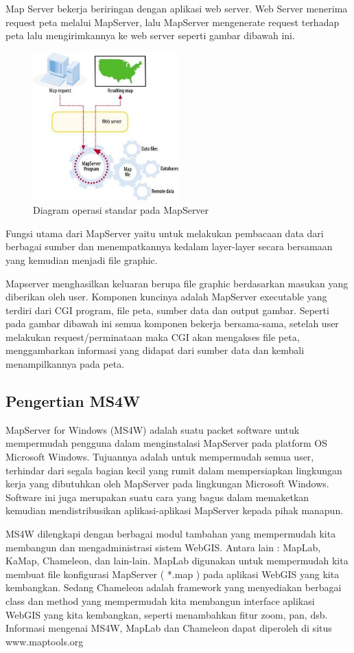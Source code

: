 Map Server bekerja beriringan dengan aplikasi web server. Web Server menerima request peta melalui MapServer, lalu MapServer mengenerate request terhadap peta lalu mengirimkannya ke web server seperti gambar dibawah ini.
\begin{figure}[ht]
	    \centerline{\includegraphics[width=0.50\textwidth]{figures/gambar5.JPG}}
	    \caption{Diagram operasi standar pada MapServer}
		\label{gambar5}
		\end{figure}
Fungsi utama dari MapServer yaitu untuk melakukan pembacaan data dari berbagai sumber dan menempatkannya kedalam layer-layer secara bersamaan yang kemudian menjadi file graphic.

Mapserver menghasilkan keluaran berupa file graphic berdasarkan masukan yang diberikan oleh user. Komponen kuncinya adalah MapServer executable yang terdiri dari CGI program, file peta, sumber data dan output gambar. Seperti pada gambar dibawah ini semua komponen bekerja bersama-sama, setelah user melakukan request/perminataan maka CGI akan mengakses file peta, menggambarkan informasi yang didapat dari sumber data dan kembali menampilkannya pada peta.

\subsection{Pengertian MS4W}
MapServer for Windows (MS4W) adalah suatu packet software untuk mempermudah pengguna dalam menginstalasi MapServer pada platform OS Microsoft Windows. Tujuannya adalah untuk mempermudah semua user, terhindar dari segala bagian kecil yang rumit dalam mempersiapkan lingkungan kerja yang dibutuhkan oleh MapServer pada lingkungan Microsoft Windows. Software ini juga merupakan suatu cara yang bagus dalam memaketkan kemudian mendistribusikan aplikasi-aplikasi MapServer kepada pihak manapun.

MS4W dilengkapi dengan berbagai modul tambahan yang mempermudah kita membangun dan mengadministrasi sistem WebGIS. Antara lain : MapLab, KaMap, Chameleon, dan lain-lain. MapLab digunakan untuk mempermudah kita membuat file konfigurasi MapServer ( *.map ) pada aplikasi WebGIS yang kita kembangkan. Sedang Chameleon adalah framework yang menyediakan berbagai class dan method yang mempermudah kita membangun interface aplikasi WebGIS yang kita kembangkan, seperti menambahkan fitur zoom, pan, dsb. Informasi mengenai MS4W, MapLab dan Chameleon dapat diperoleh di situs www.maptools.org

